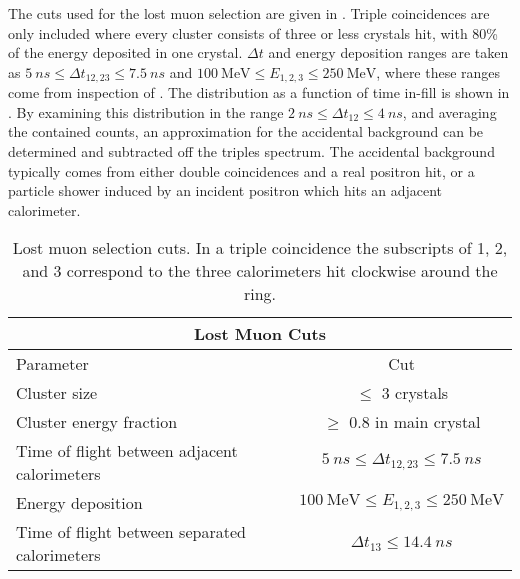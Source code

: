 The cuts used for the lost muon selection are given in . Triple coincidences are only included where every cluster consists of three or less crystals hit, with 80\% of the energy deposited in one crystal. $\Delta t$ and energy deposition ranges are taken as $\SI{5}{ns} \leq \Delta t_{12, 23} \leq \SI{7.5}{ns}$ and $\SI{100}{\MeV} \leq E_{1,2,3} \leq \SI{250}{\MeV}$, where these ranges come from inspection of . The \DT distribution as a function of time in-fill is shown in . By examining this distribution in the range $\SI{2}{ns} \leq \Delta t_{12} \leq \SI{4}{ns}$, and averaging the contained counts, an approximation for the accidental background can be determined and subtracted off the triples spectrum. The accidental background typically comes from either double coincidences and a real positron hit, or a particle shower induced by an incident positron which hits an adjacent calorimeter. 

\begin{table}[h]
\centering
\setlength\tabcolsep{10pt}
\renewcommand{\arraystretch}{1.2}
\begin{tabular*}{1\linewidth}{@{\extracolsep{\fill}}lc}
  \hline
    \multicolumn{2}{c}{\textbf{Lost Muon Cuts}} \\
  \hline\hline
    Parameter & Cut \\
  \hline
    Cluster size & $\leq$ 3 crystals \\
    Cluster energy fraction & $\geq$ 0.8 in main crystal \\
    Time of flight between adjacent calorimeters & $\SI{5}{ns} \leq \Delta t_{12, 23} \leq \SI{7.5}{ns}$ \\
    Energy deposition & $\SI{100}{\MeV} \leq E_{1,2,3} \leq \SI{250}{\MeV}$ \\
    Time of flight between separated calorimeters & $\Delta t_{13} \leq \SI{14.4}{ns}$ \\
  \hline 
\end{tabular*}
\caption[Lost muon cuts]{Lost muon selection cuts. In a triple coincidence the subscripts of 1, 2, and 3 correspond to the three calorimeters hit clockwise around the ring.}
\label{tab:lostmuoncuts}
\end{table}



